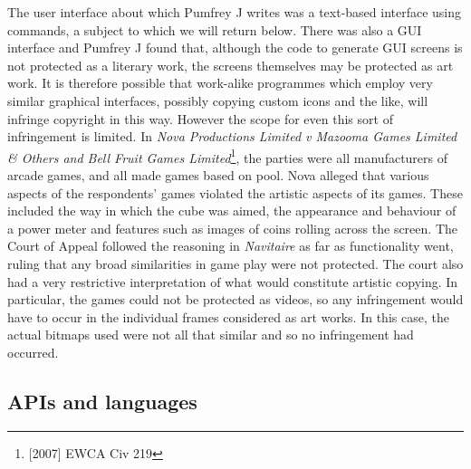 \documentclass[a4paper,12pt]{article}
\begin{document}
The user interface about which Pumfrey J writes was a text-based interface
using commands, a subject to which we will return below. There was also a
GUI interface and Pumfrey J found that, although the code to generate GUI
screens is not protected as a literary work, the screens themselves may be
protected as art work. It is therefore possible that work-alike programmes which
employ very similar graphical interfaces, possibly copying custom icons and
the like, will infringe copyright in this way. However the scope for even
this sort of infringement is limited. In \textit{Nova Productions Limited
v Mazooma Games Limited \& Others
and Bell Fruit Games Limited}\footnote{[2007] EWCA Civ 219}, the parties
were all manufacturers of arcade games, and all made games based on
pool. Nova alleged that various aspects of the respondents' games violated
the artistic aspects of its games. These included the way in which the cube
was aimed, the appearance and behaviour of a power meter and features such
as images of coins rolling across the screen. The Court of Appeal followed the
reasoning in \emph{Navitaire} as far as functionality went, ruling that any
broad similarities in game play were not protected. The court also had a very
restrictive interpretation of what would constitute artistic copying. In
particular, the games could not be protected as videos, so any infringement
would have to occur in the individual frames considered as art works. In
this case, the actual bitmaps used were not all that similar and so no
infringement had occurred.

\subsection{APIs and languages}
\end{document}
